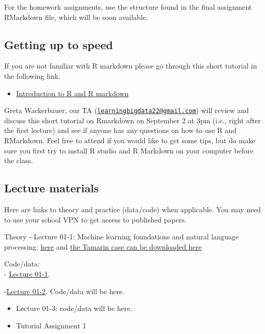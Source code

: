 \documentclass[
]{article}
\providecommand{\tightlist}{%
  \setlength{\itemsep}{0pt}\setlength{\parskip}{0pt}}
\begin{document}
For the homework assignments, use the structure found in the final
assignment RMarkdown file, which will be soon available.

\hypertarget{getting-up-to-speed}{%
\subsection{Getting up to speed}\label{getting-up-to-speed}}

If you are not familiar with R markdown please go through this short
tutorial in the following link.

\begin{itemize}
\tightlist
\item
  \href{https://github.com/guiliberali/Learning-from-Big-Data-Module-1/blob/main/preparation/Intro-to-RMarkdown.pdf}{Introduction
  to R and R markdown}
\end{itemize}

Greta Wackerbauer, our TA
(\href{mailto:learningbigdata22@gmail.com}{\nolinkurl{learningbigdata22@gmail.com}})
will review and discuss this short tutorial on Rmarkdown on September 2
at 3pm (i.e., right after the first lecture) and see if anyone has any
questions on how to use R and RMarkdown. Feel free to attend if you
would like to get some tips, but do make sure you first try to install R
studio and R Markdown on your computer before the class.

\hypertarget{lecture-materials}{%
\subsection{Lecture materials}\label{lecture-materials}}

Here are links to theory and practice (data/code) when applicable. You
may need to use your school VPN to get access to published papers.

Theory - Lecture 01-1: Machine learning foundations and natural language
processing:
\href{https://journals.sagepub.com/doi/full/10.1177/0022242919873106}{here}
and
\href{https://www.thecasecentre.org/course/registerForCourse?ucc=C\%2D4874\%2D6030\%2DSCH}{the
Tamarin case can be downloaded here}

Code/data:\\
-
\href{https://github.com/guiliberali/Learning-from-Big-Data-Module-1/blob/main/lectures/Lecture_1/session_1.Rmd}{Lecture
01-1}.

-\href{https://github.com/guiliberali/Learning-from-Big-Data-Module-1/blob/main/lectures/Lecture_2/Cartoon_Example_NBC.xlsx}{Lecture
01-2}. Code/data will be here.

\begin{itemize}
\item
  Lecture 01-3: code/data will be here.
\item
  Tutorial Assignment 1
\end{itemize}
\end{document}
